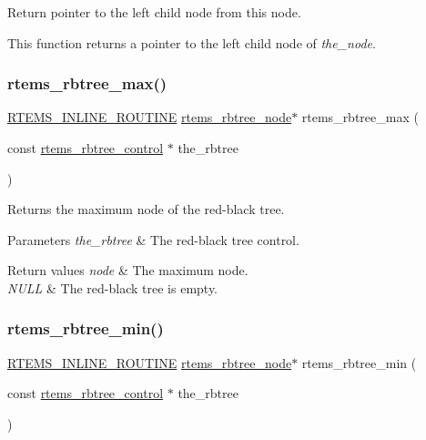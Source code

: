 Return pointer to the left child node from this node. 

This function returns a pointer to the left child node of {\itshape the\+\_\+node}. \mbox{\label{group__ClassicRBTrees_gad2f68e2923189451b5cda9223920d833}} 
\subsubsection{\texorpdfstring{rtems\_rbtree\_max()}{rtems\_rbtree\_max()}}
{\footnotesize\ttfamily \mbox{\hyperlink{group__RTEMSScoreBaseDefs_gac216239df231d5dbd15e3520b0b9313f}{R\+T\+E\+M\+S\+\_\+\+I\+N\+L\+I\+N\+E\+\_\+\+R\+O\+U\+T\+I\+NE}} \mbox{\hyperlink{group__ClassicRBTrees_gaef47fc7fc61856c9afbf7f18a26ff80d}{rtems\+\_\+rbtree\+\_\+node}}$\ast$ rtems\+\_\+rbtree\+\_\+max (\begin{DoxyParamCaption}\item[{const \mbox{\hyperlink{group__ClassicRBTrees_ga21fe446d0b3cb8b25c814e93357753ef}{rtems\+\_\+rbtree\+\_\+control}} $\ast$}]{the\+\_\+rbtree }\end{DoxyParamCaption})}



Returns the maximum node of the red-\/black tree. 


\begin{DoxyParams}{Parameters}
{\em the\+\_\+rbtree} & The red-\/black tree control.\\
\hline
\end{DoxyParams}

\begin{DoxyRetVals}{Return values}
{\em node} & The maximum node. \\
\hline
{\em N\+U\+LL} & The red-\/black tree is empty. \\
\hline
\end{DoxyRetVals}
\mbox{\label{group__ClassicRBTrees_gade1b71feee109e6818b952e74a0211e9}} 
\subsubsection{\texorpdfstring{rtems\_rbtree\_min()}{rtems\_rbtree\_min()}}
{\footnotesize\ttfamily \mbox{\hyperlink{group__RTEMSScoreBaseDefs_gac216239df231d5dbd15e3520b0b9313f}{R\+T\+E\+M\+S\+\_\+\+I\+N\+L\+I\+N\+E\+\_\+\+R\+O\+U\+T\+I\+NE}} \mbox{\hyperlink{group__ClassicRBTrees_gaef47fc7fc61856c9afbf7f18a26ff80d}{rtems\+\_\+rbtree\+\_\+node}}$\ast$ rtems\+\_\+rbtree\+\_\+min (\begin{DoxyParamCaption}\item[{const \mbox{\hyperlink{group__ClassicRBTrees_ga21fe446d0b3cb8b25c814e93357753ef}{rtems\+\_\+rbtree\+\_\+control}} $\ast$}]{the\+\_\+rbtree }\end{DoxyParamCaption})}



